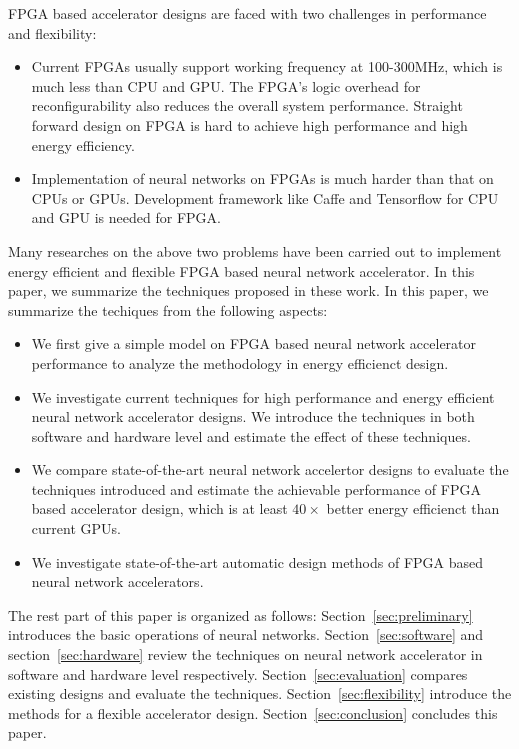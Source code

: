 FPGA based accelerator designs are faced with two challenges in performance and flexibility:
\begin{itemize}
    \item Current FPGAs usually support working frequency at 100-300MHz, which is much less than CPU and GPU. The FPGA's logic overhead for reconfigurability also reduces the overall system performance. Straight forward design on FPGA is hard to achieve high performance and high energy efficiency.
    \item Implementation of neural networks on FPGAs is much harder than that on CPUs or GPUs. Development framework like Caffe and Tensorflow for CPU and GPU is needed for FPGA.
\end{itemize}
 
Many researches on the above two problems have been carried out to implement energy efficient and flexible FPGA based neural network accelerator. In this paper, we summarize the techniques proposed in these work. In this paper, we summarize the techiques from the following aspects:
\begin{itemize}
    \item We first give a simple model on FPGA based neural network accelerator performance to analyze the methodology in energy efficienct design.
    \item We investigate current techniques for high performance and energy efficient neural network accelerator designs. We introduce the techniques in both software and hardware level and estimate the effect of these techniques.
    \item We compare state-of-the-art neural network accelertor designs to evaluate the techniques introduced and estimate the achievable performance of FPGA based accelerator design, which is at least $40\times$ better energy efficienct than current GPUs.
    \item We investigate state-of-the-art automatic design methods of FPGA based neural network accelerators. 
\end{itemize}

The rest part of this paper is organized as follows: Section~\ref{sec:preliminary} introduces the basic operations of neural networks. Section~\ref{sec:software} and section~\ref{sec:hardware} review the techniques on neural network accelerator in software and hardware level respectively. Section~\ref{sec:evaluation} compares existing designs and evaluate the techniques. Section~\ref{sec:flexibility} introduce the methods for a flexible accelerator design. Section~\ref{sec:conclusion} concludes this paper.